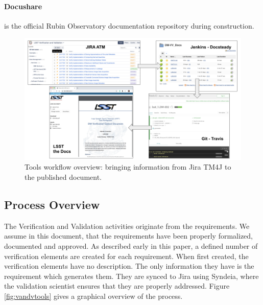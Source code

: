 \paragraph{Docushare}
is the official Rubin Observatory documentation repository during construction.

\begin{figure}
\begin{center}
\includegraphics[width=\textwidth]{imgs/screenshots.png}
 \caption{Tools workflow overview: bringing information from Jira TM4J to the published document.}
 \label{fig:overview}
\end{center}
\end{figure}


\subsection{Process Overview}\label{sec:proc}

The Verification and Validation activities originate from the requirements.
We assume in this document, that the requirements have been properly formalized, documented and approved.
As described early in this paper, a defined number of verification elements are created for each requirement.
When first created, the verification elements have no description.
The only information they have is the requirement which generates them.
They are synced to Jira using Syndeia, where the validation scientist ensures that they are properly addressed.
Figure  \ref{fig:vandvtools} gives a graphical overview of the process.

